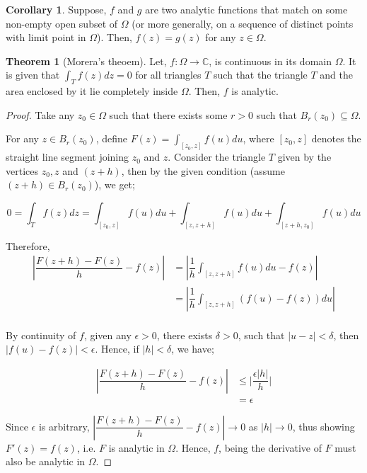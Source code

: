 \documentclass[12pt]{article}
\newcommand{\C}{\mathbb{C}}
\theoremstyle{definition}
\newtheorem{thm}{Theorem}
\newtheorem{cor}{Corollary}
\newenvironment{theorem}{
\begin{tcolorbox}[colback=green!5!white,colframe=green!75!black, parbox = false]\begin{thm} }{\end{thm}\end{tcolorbox} }
\newenvironment{corollary}{
\begin{tcolorbox}[colback=blue!5!white,colframe=blue!75!black, parbox = false]\begin{cor} }{\end{cor}\end{tcolorbox} }
\begin{document}
\begin{corollary}
    Suppose, $f$ and $g$ are two analytic functions that match on some non-empty open subset of $\Omega$ (or more generally, on a sequence of distinct points with limit point in $\Omega$). Then, $f(z) = g(z)$ for any $z \in \Omega$. 
\end{corollary}


\begin{theorem}[Morera's theoem]
    Let, $f : \Omega \rightarrow \C$, is continuous in its domain $\Omega$. It is given that $\int_T f(z)dz = 0$ for all triangles $T$ such that the triangle $T$ and the area enclosed by it lie completely inside $\Omega$.
    Then, $f$ is analytic.    
\end{theorem}

\begin{proof}
    Take any $z_0 \in \Omega$ such that there exists some $r > 0$ such that $B_r(z_0) \subseteq \Omega$. 

    For any $z \in B_r(z_0)$, define $F(z) = \int_{[z_0, z]} f(u)du$, where $[z_0, z]$ denotes the straight line segment joining $z_0$ and $z$. Consider the triangle $T$ given by the vertices $z_0, z$ and $(z + h)$, then by the given condition (assume $(z + h) \in B_r(z_0)$), we get;
    
    $$0 = \int_T f(z)dz = \int_{[z_0, z]} f(u)du + \int_{[z, z+h]}f(u)du + \int_{[z+h, z_0]}f(u)du$$

    Therefore,
    \begin{align*}
        \left\vert \dfrac{F(z+h) - F(z)}{h} - f(z) \right\vert
        & = \left\vert \dfrac{1}{h}\int_{[z, z+h]} f(u)du  - f(z)\right\vert \\
        & = \left\vert \dfrac{1}{h}\int_{[z, z+h]} (f(u) - f(z)) du \right\vert\\
    \end{align*}

    By continuity of $f$, given any $\epsilon > 0$, there exists $\delta > 0$, such that $\vert u - z\vert < \delta$, then $\vert f(u) - f(z) \vert < \epsilon$. Hence, if $\vert h \vert < \delta$, we have;

    \begin{align*}
        \left\vert \dfrac{F(z+h) - F(z)}{h} - f(z) \right\vert 
        & \leq \vert \dfrac{\epsilon \vert h\vert }{h}\vert \\
        & = \epsilon
    \end{align*}

    Since $\epsilon$ is arbitrary, $\left\vert \dfrac{F(z+h) - F(z)}{h} - f(z) \right\vert \rightarrow 0$ as $\vert h \vert \rightarrow 0$, thus showing $F'(z) = f(z)$, i.e. $F$ is analytic in $\Omega$. Hence, $f$, being the derivative of $F$ must also be analytic in $\Omega$.
\end{proof}
\end{document}
